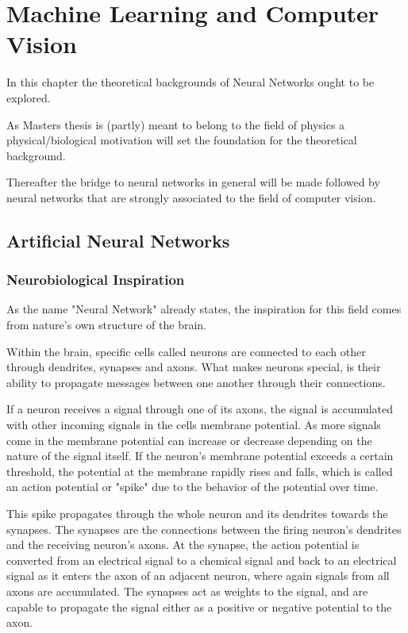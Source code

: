 \setchapterpreamble[u]{\margintoc}
\chapter{Machine Learning and Computer Vision}
In this chapter the theoretical backgrounds of Neural Networks ought to be explored.

As Masters thesis is (partly) meant to belong to the field of physics a physical/biological
motivation will set the foundation for the theoretical background.

Thereafter the bridge to neural networks in general will be made followed by neural
networks that are strongly associated to the field of computer vision.

\section{Artificial Neural Networks}

\subsection{Neurobiological Inspiration}

As the name "Neural Network" already states, the inspiration for this field comes
from nature's own structure of the brain.

Within the brain, specific cells called neurons are connected to each other through
dendrites, synapses and axons.
What makes neurons special, is their ability to propagate messages between one another
through their connections.

If a neuron receives a signal through one of its axons, the signal is accumulated
with other incoming signals in the cells membrane potential.
As more signals come in the membrane potential can increase or decrease depending on
the nature of the signal itself.
If the neuron's membrane potential exceeds a certain threshold, the potential at the
membrane rapidly rises and falls, which is called an action potential or "spike"
due to the behavior of the potential over time.

This spike propagates through the whole neuron and its dendrites towards the synapses.
The synapses are the connections between the firing neuron's dendrites and the 
receiving neuron's axons.
At the synapse, the action potential is converted from an electrical signal to
a chemical signal and back to an electrical signal as it enters the axon of an adjacent
neuron, where again signals from all axons are accumulated.
The synapses act as weights to the signal, and are capable to propagate the signal
either as a positive or negative potential to the axon.

